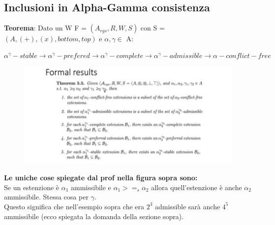\subsection{Inclusioni in Alpha-Gamma consistenza}
\textbf{Teorema}: Dato un W F = $(A_{rgs }, R, W, S)$ con S = $(A, (+), (x), bottom, top)$ e $\alpha, \gamma \in$ A:
\begin{center}
    $\alpha^\gamma-stable \rightarrow \alpha^\gamma-prefered \rightarrow \alpha^\gamma-complete \rightarrow \alpha^\gamma-admissible \rightarrow \alpha-conflict-free$
\end{center}
\begin{figure}[htp]
	\centering
    \includegraphics[width=12cm, keepaspectratio]{img/Cap6/alpha-gamma.png}
\end{figure}
\textbf{Le uniche cose spiegate dal prof nella figura sopra sono:}
\\Se un estenzione è $ \alpha_1$ ammissibile e $\alpha_1 >=_s \alpha_2$ allora quell’estenzione è anche $\alpha_2$ ammissibile. Stessa cosa per $\gamma$.
\\Questo significa che nell’esempio sopra che era $2^3$ admissible sarà anche $4^5$ ammissibile (ecco spiegata la domanda della sezione sopra).
\newpage
